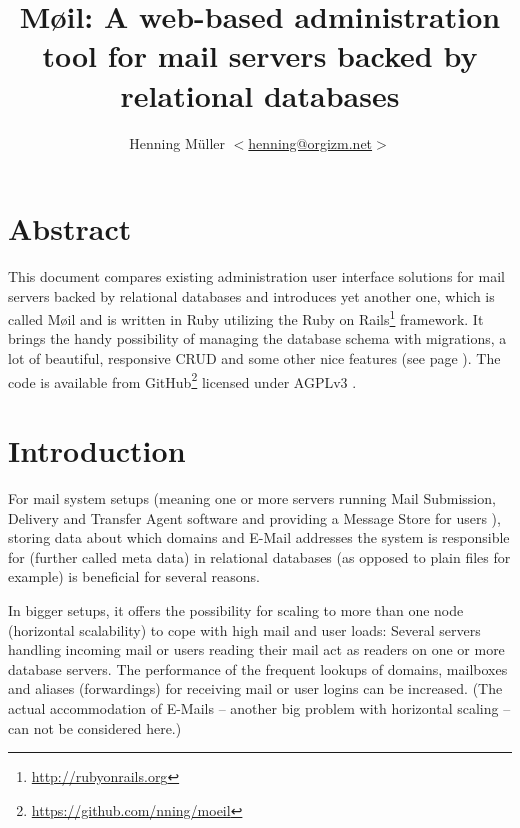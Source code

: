 \documentclass[12pt,a4paper]{scrartcl}
\begin{document}
	\title{Møil: A web-based administration tool for mail servers backed by relational databases}
	\author{Henning Müller $<$\href{mailto:henning@orgizm.net}{henning@orgizm.net}$>$}
	\date{}

	\maketitle


	\section*{Abstract}
		This document compares existing administration user interface solutions
		for mail servers backed by relational databases and introduces yet
		another one, which is called Møil and is written in Ruby utilizing the
		Ruby on Rails\footnote{\url{http://rubyonrails.org}} framework. It
		brings the handy possibility of managing the database schema with
		migrations, a lot of beautiful, responsive CRUD and some other nice
		features (see page \pageref{moeil-features}). The code is available from
		GitHub\footnote{\url{https://github.com/nning/moeil}} licensed under
		AGPLv3 \cite{agpl}.

	\section*{Introduction}

		For mail system setups (meaning one or more servers running Mail
		Submission, Delivery and Transfer Agent software and providing a
		Message Store for users \cite{mail-architecture}), storing data about
		which domains and E-Mail addresses the system is responsible for
		(further called meta data) in relational databases (as opposed to plain
		files for example) is beneficial for several reasons.


		In bigger setups, it offers the possibility for scaling to more than
		one node (horizontal scalability) to cope with high mail and user
		loads: Several servers handling incoming mail or users reading their
		mail act as readers on one or more database servers. The performance of
		the frequent lookups of domains, mailboxes and aliases (forwardings)
		for receiving mail or user logins can be increased. (The actual
		accommodation of E-Mails -- another big problem with horizontal scaling
		-- can not be considered here.)

\end{document}
